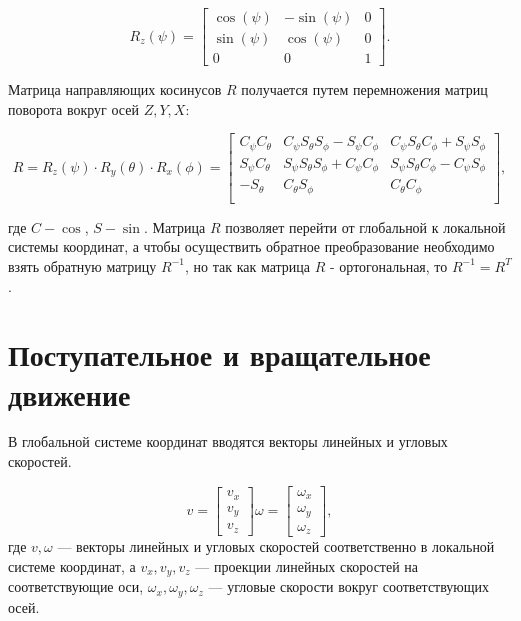 \begin{equation}
R_z(\psi) = \begin{bmatrix}
    \cos(\psi) & -\sin(\psi) & 0 \\
    \sin(\psi) & \cos(\psi) & 0 \\
    0 & 0 & 1
\end{bmatrix}.
\end{equation}


Матрица направляющих косинусов \(R\) получается путем перемножения матриц поворота вокруг осей \(Z, Y, X\):

\begin{equation}
R = R_z(\psi) \cdot R_y(\theta) \cdot R_x(\phi) =
\begin{bmatrix}
C_{\psi} C_{\theta} & C_{\psi} S_{\theta} S_{\phi} - S_{\psi} C_{\phi} & C_{\psi} S_{\theta} C_{\phi} + S_{\psi} S_{\phi} \\
S_{\psi} C_{\theta} & S_{\psi} S_{\theta} S_{\phi} + C_{\psi} C_{\phi} & S_{\psi} S_{\theta} C_{\phi} - C_{\psi} S_{\phi} \\
-S_{\theta} & C_{\theta} S_{\phi} & C_{\theta} C_{\phi} \\
\end{bmatrix},
\end{equation}

где \( C - \cos\), \(S - \sin \). Матрица \(R\) позволяет перейти от глобальной к локальной системы координат, а чтобы
осуществить обратное преобразование необходимо взять обратную матрицу \(R^{-1}\), но так как матрица \(R\) - 
ортогональная, то \(R^{-1}=R^T\).

\section{Поступательное и вращательное движение}

В глобальной системе координат вводятся векторы линейных и угловых скоростей.

\begin{equation}
v = 
\begin{bmatrix}
    v_x \\ v_y \\ v_z
\end{bmatrix}
\omega = 
\begin{bmatrix}
    \omega_x \\ \omega_y \\ \omega_z
\end{bmatrix},
\end{equation}
где \(v, \omega\) --- векторы линейных и угловых скоростей соответственно в локальной системе координат, а 
\(v_x, v_y, v_z\) --- проекции линейных скоростей на соответствующие оси, 
\( \omega_x, \omega_y, \omega_z\) --- угловые скорости вокруг соответствующих осей.


